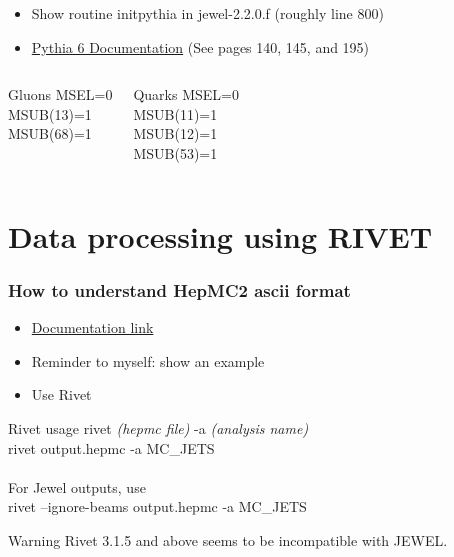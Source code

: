 \documentclass{beamer}
\begin{document}
\begin{frame}
 \begin{itemize}
  \item Show routine initpythia in jewel-2.2.0.f (roughly line 800)
  \item \href{https://pythia.org/download/pythia6/lutp0613man2.pdf}{Pythia 6 Documentation} (See pages 140, 145, and 195)
 \end{itemize}

 \begin{columns}

  \begin{exampleblock}{Gluons}
MSEL=0 \\
MSUB(13)=1\\
MSUB(68)=1\\
\phantom{Place holder MSUB}
  \end{exampleblock}

  \begin{block}{Quarks}
MSEL=0\\
MSUB(11)=1\\
MSUB(12)=1\\
MSUB(53)=1
  \end{block}


 \end{columns}


\end{frame}


\section{Data processing using RIVET}

\begin{frame}
 \frametitle{How to understand HepMC2 ascii format}
 \begin{itemize}
  \item \href{http://hepmc.web.cern.ch/hepmc/releases/HepMC2_user_manual.pdf}{Documentation link}
  \item Reminder to myself: show an example
  \item Use Rivet
 \end{itemize}

\begin{exampleblock}{Rivet usage}
	rivet \textit{(hepmc file)} -a \textit{(analysis name)}\\
	rivet output.hepmc -a MC\_JETS\\
	\phantom{Placeholder}\\
	For Jewel outputs, use\\
	rivet --ignore-beams output.hepmc -a MC\_JETS
\end{exampleblock}

\begin{alertblock}{Warning}
	Rivet 3.1.5 and above seems to be incompatible with JEWEL.
\end{alertblock}

\end{frame}  
\end{document}
